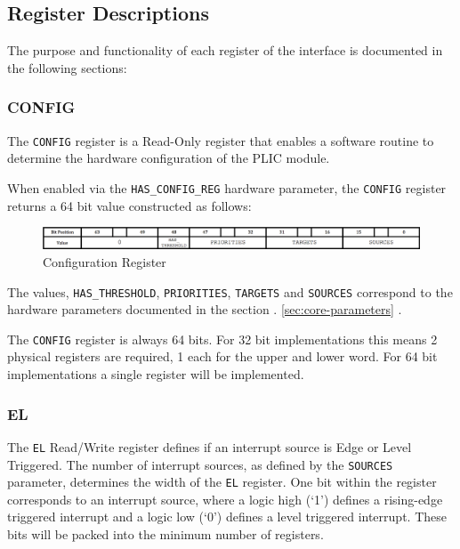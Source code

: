 \subsection{Register Descriptions}

The purpose and functionality of each register of the interface is documented in the following sections:

\subsubsection{CONFIG}

The \texttt{CONFIG} register is a Read-Only register that enables a
software routine to determine the hardware configuration of the PLIC
module.

When enabled via the \texttt{HAS\_CONFIG\_REG} hardware parameter, the
\texttt{CONFIG} register returns a 64 bit value constructed as follows:

\begin{figure}[h] 
	\includegraphics[width=\linewidth]{assets/img/CONFIG} 
	\caption[Configuration Register]{Configuration Register}
	\label{fig:configreg}
\end{figure}

The values, \texttt{HAS\_THRESHOLD}, \texttt{PRIORITIES},
\texttt{TARGETS} and \texttt{SOURCES} correspond to the hardware
parameters documented in the section
\ifdefined{}.
\else
\ref{sec:core-parameters} .
\fi


The \texttt{CONFIG} register is always 64 bits. For 32 bit
implementations this means 2 physical registers are required, 1 each for
the upper and lower word. For 64 bit implementations a single register
will be implemented.

\subsubsection{EL}

The \texttt{EL} Read/Write register defines if an interrupt source is Edge or Level Triggered. The number of interrupt sources, as defined by the
\texttt{SOURCES} parameter, determines the width of the \texttt{EL} register. 
One bit within the register corresponds to an interrupt source, where a 
logic high (`1') defines a rising-edge triggered interrupt and a logic 
low (`0') defines a level triggered interrupt. These bits will be
packed into the minimum number of registers.


